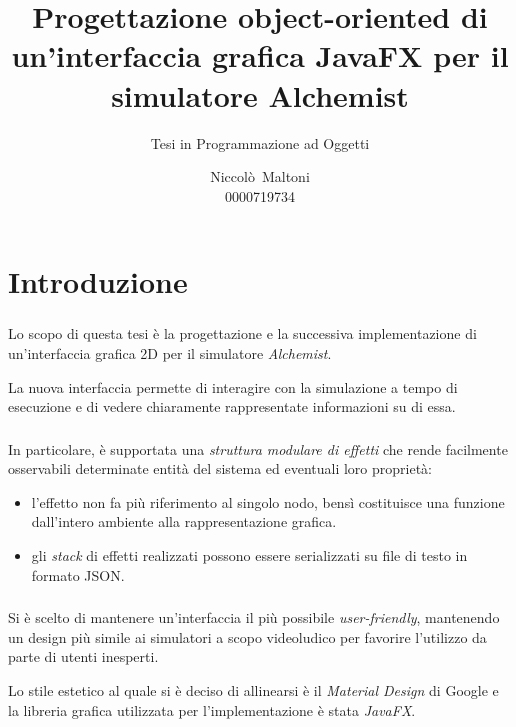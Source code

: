 \documentclass[%
]{beamer}
\title[Nuova GUI Alchemist in JavaFX]{%
    Progettazione object-oriented di un'interfaccia grafica %
    JavaFX per il simulatore Alchemist
}
\subtitle{Tesi in Programmazione ad Oggetti}
\author[Niccolò~Maltoni]{Niccolò~Maltoni\\0000719734}
\date{%
}
\institute[%
]{%
    Alma Mater Studiorum - Università di Bologna\\%
    Campus di Cesena%
}
\newcommand{\engEmph}[1] {\emph{\foreignlanguage{english}#1}}
\begin{document}
    \begin{frame}
        \titlepage
    \end{frame}

    \section{Introduzione}\label{sec:intro}
    \begin{frame}
        \frametitle{\insertsection}

        Lo scopo di questa tesi è la progettazione e la successiva implementazione di un'interfaccia grafica 2D per il simulatore \emph{Alchemist}. %

        \medskip %
        \pause

        La nuova interfaccia permette di interagire con la simulazione a tempo di esecuzione e di vedere chiaramente rappresentate informazioni su di essa.
    \end{frame}

    \begin{frame}
        \frametitle{\insertsection}

        In particolare, è supportata una \emph{struttura modulare di effetti} che rende facilmente osservabili determinate entità del sistema ed eventuali loro proprietà:

        \begin{itemize}[<+(1)->]
            \item
                l'effetto non fa più riferimento al singolo nodo, bensì costituisce una funzione dall'intero ambiente alla rappresentazione grafica.
            \item
                gli \engEmph{stack} di effetti realizzati possono essere serializzati su file di testo in formato JSON.
        \end{itemize}
    \end{frame}

    \begin{frame}
        \frametitle{\insertsection}

        Si è scelto di mantenere un'interfaccia il più possibile \engEmph{user-friendly}, mantenendo un design più simile ai simulatori a scopo videoludico per favorire l'utilizzo da parte di utenti inesperti.

        \medskip
        \pause

        Lo stile estetico al quale si è deciso di allinearsi è il \emph{Material Design} di Google e la libreria grafica utilizzata per l'implementazione è stata \emph{JavaFX}.
    \end{frame}
\end{document}
